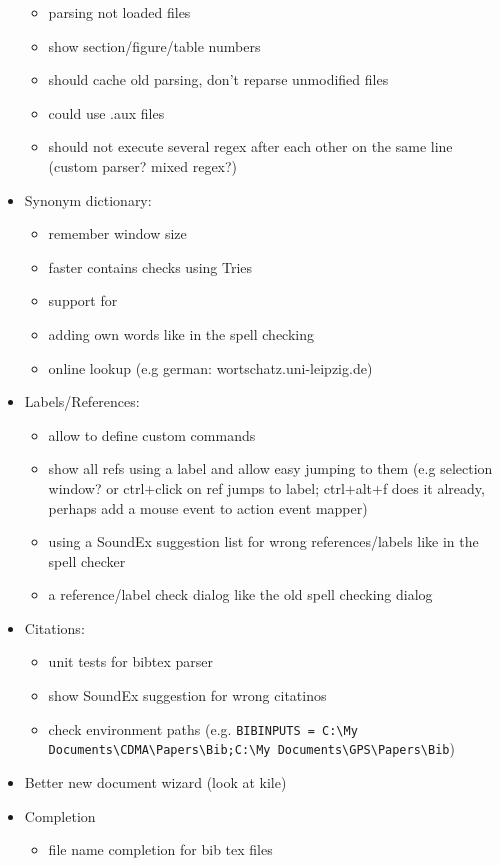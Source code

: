 \documentclass[10pt,a4paper,landscape]{report}
\begin{document}
\begin{itemize}
\begin{itemize}
		\item parsing not loaded files
		\item show section/figure/table numbers
		\item should cache old parsing, don't reparse unmodified files
		\item could use .aux files
		\item should not execute several regex after each other on the same line (custom parser? mixed regex?)	
	\end{itemize}
	\item Synonym dictionary: \begin{itemize}
		\item remember window size
		\item faster contains checks using Tries
		\item support for 
		\item adding own words like in the spell checking 
		\item online lookup (e.g german: wortschatz.uni-leipzig.de)
	\end{itemize}
	\item Labels/References: \begin{itemize}
		\item allow to define custom commands
		\item show all refs using a label and allow easy jumping to them (e.g selection window? or ctrl+click on ref jumps to label; ctrl+alt+f does it already, perhaps add a mouse event to action event mapper)
		\item using a SoundEx suggestion list for wrong references/labels like in the spell checker
		\item a reference/label check dialog like the old spell checking dialog
	\end{itemize}
	\item Citations: \begin{itemize}
		\item unit tests for bibtex parser
		\item show SoundEx suggestion for wrong citatinos
		\item check environment paths (e.g. \verb+BIBINPUTS = C:\My Documents\CDMA\Papers\Bib;C:\My Documents\GPS\Papers\Bib+)
	\end{itemize}
	\item Better new document wizard (look at kile)
	\item Completion \begin{itemize}
	\item file name completion for bib tex files

\end{itemize}
\end{itemize}
\end{document}
